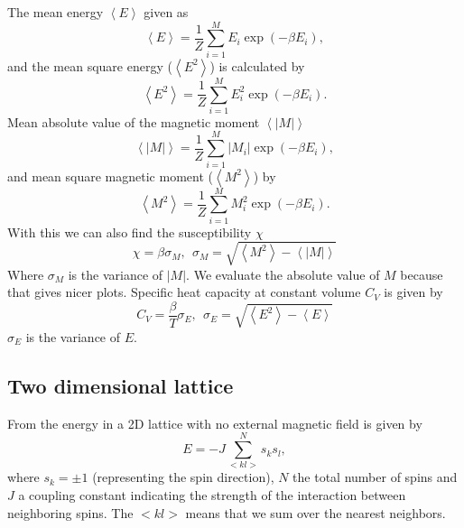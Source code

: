 \documentclass[reprint, english,notitlepage,nofootinbib]{revtex4-1}  %
\begin{document}
The mean energy $\left<E\right>$ given as
\begin{equation}
	\label{eq:expected_energy}
	\left<E\right> = \frac{1}{Z} \sum_{i=1}^{M}E_i\exp(-\beta E_i),
\end{equation}
and the mean square energy ($\left<E^2\right>$) is calculated by
\begin{equation}
	\label{eq:expected_energy_sq}
	\left<E^2\right> = \frac{1}{Z} \sum_{i=1}^{M}E_i^2\exp(-\beta E_i).
\end{equation}
Mean absolute value of the magnetic moment $\left<|M|\right>$
\begin{equation}
	\label{eq:expected_magnetic_moment}
	\left<|M|\right> = \frac{1}{Z} \sum_{i=1}^{M}|M_i|\exp(-\beta E_i),
\end{equation}
and mean square magnetic moment ($\left<M^2\right>$) by
\begin{equation}
\label{eq:expected_magnetic_moment_sq}
\left<M^2\right> = \frac{1}{Z} \sum_{i=1}^{M}M_i^2\exp(-\beta E_i).
\end{equation}
With this we can also find the susceptibility $\chi$
\begin{equation}
	\label{eq:magnetic_susceptibility}
	\chi = \beta \sigma_M, \ \ \sigma_M = \sqrt{\left<M^2\right> - \left<|M|\right>}
\end{equation}
Where $\sigma_M$ is the variance of $|M|$. We evaluate the absolute value of $M$ because that gives nicer plots. Specific heat capacity at constant volume $C_V$ is given by
\begin{equation}
	\label{eq:specific_heat_capacity}
	C_V = \frac{\beta}{T}\sigma_E, \ \ \sigma_E = \sqrt{\left<E^2\right> - \left<E\right>}
\end{equation}
$\sigma_E$ is the variance of $E$.

\subsection*{Two dimensional lattice} \label{sect:2by2Lattice}

From \cite{oppgavetekst} the energy in a 2D lattice with no external magnetic field is given by
\begin{equation}
	\label{eq:2D_energy}
	E = -J \sum_{<kl>}^{N}s_ks_l,
\end{equation}
where $s_k = \pm 1$ (representing the spin direction), $N$ the total number of spins and $J$ a coupling constant indicating the strength of the interaction between neighboring spins. The $<kl>$ means that we sum over the nearest neighbors.
\end{document}
